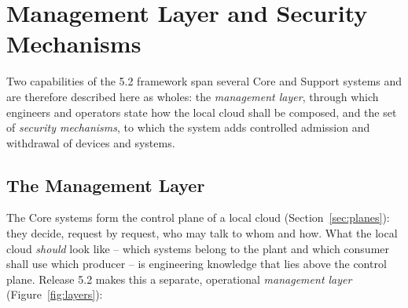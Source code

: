 \documentclass[a4paper]{arrowhead}
\newcommand{\sys}[1]{\textcolor{ArrowheadBlue}{\textbf{\ahbreak{#1}}}}      %
\begin{document}
\section{Management Layer and Security Mechanisms}
\label{sec:mgmtsec}

Two capabilities of the 5.2 framework span several Core and Support systems and are therefore
described here as wholes: the \emph{management layer}, through which engineers and operators state
how the local cloud shall be composed, and the set of \emph{security mechanisms}, to which the
\sys{Onboarding} system adds controlled admission and withdrawal of devices and systems.

\subsection{The Management Layer}
\label{sec:mgmt}

The Core systems form the control plane of a local cloud (Section~\ref{sec:planes}): they decide,
request by request, who may talk to whom and how. What the local cloud \emph{should} look like --
which systems belong to the plant and which consumer shall use which producer -- is engineering
knowledge that lies above the control plane. Release 5.2 makes this a separate, operational
\emph{management layer} (Figure~\ref{fig:layers}):
\end{document}
